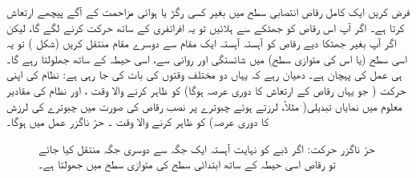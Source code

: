 

 
فرض کریں ایک کامل رقاص انتصابی سطح میں بغیر کسی رگڑ یا ہوائی مزاحمت کے آگے پیچھے ارتعاش کرتا ہے۔ اگر آپ اس رقاص کو جھٹکے سے ہلائیں تو یہ افراتفری کے ساتھ حرکت کرنے لگے گا، لیکن اگر آپ بغیر جھٹکا دیے رقاص کو آہستہ آہستہ ایک مقام سے دوسرے مقام منتقل کریں (شکل ) تو یہ اسی سطح (یا اس کی متوازی سطح) میں شائستگی اور روانی سے، اسی حیطہ کے ساتھ جھلولتا رہے گا۔ ہی  عمل کی پہچان ہے۔ دھیان رہے کہ یہاں دو مختلف وقتوں کی بات کی جا رہی ہے: نظام کی اپنی حرکت ( جو یہاں رقاص کے ارتعاش کا دوری عرصہ ہوگا) کو ظاہر کرنے والا وقت ، اور نظام کی مقادیر معلوم میں نمایاں تبدیلی( مثلاً، لرزتے ہوئے چبوترے پر نصب رقاص کی صورت میں چبوترے کی لرزش کا دوری عرصہ) کو ظاہر کرنے والا  وقت ۔ حرّ ناگزر عمل میں  ہوگا۔

\begin{figure}
\centering
{}
\caption{حرّ ناگزر حرکت: اگر ڈبے کو نہایت آہستہ ایک جگہ سے دوسری جگہ منتقل کیا جائے تو رقاص اسی حیطہ کے ساتھ ابتدائی سطح کی متوازی سطح میں جھولتا ہے۔}
\label{شکل_حرارت_نا_گزر_آہستہ_منتقلی}
\end{figure}


